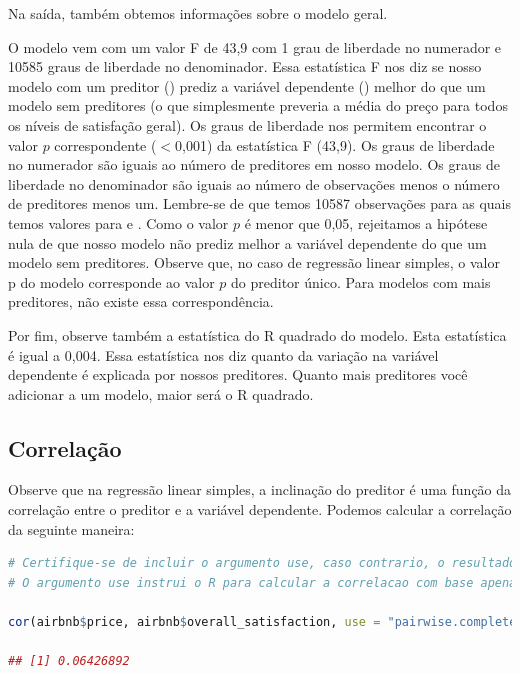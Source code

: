 \documentclass{article}
\begin{document}
Na saída, também obtemos informações sobre o modelo geral.

O modelo vem com um valor F de 43,9 com 1 grau de liberdade no numerador e 10585 graus de liberdade no denominador. Essa estatística F nos diz se nosso modelo com um preditor () prediz a variável dependente () melhor do que um modelo sem preditores (o que simplesmente preveria a média do preço para todos os níveis de satisfação geral). Os graus de liberdade nos permitem encontrar o valor $p$ correspondente ($<$0,001) da estatística F (43,9). Os graus de liberdade no numerador são iguais ao número de preditores em nosso modelo. Os graus de liberdade no denominador são iguais ao número de observações menos o número de preditores menos um. Lembre-se de que temos 10587 observações para as quais temos valores para  e . Como o valor $p$ é menor que 0,05, rejeitamos a hipótese nula de que nosso modelo não prediz melhor a variável dependente do que um modelo sem preditores. Observe que, no caso de regressão linear simples, o valor p do modelo corresponde ao valor $p$ do preditor único. Para modelos com mais preditores, não existe essa correspondência.

Por fim, observe também a estatística do R quadrado do modelo. Esta estatística é igual a 0,004. Essa estatística nos diz quanto da variação na variável dependente é explicada por nossos preditores. Quanto mais preditores você adicionar a um modelo, maior será o R quadrado.


\subsection{Correlação}

Observe que na regressão linear simples, a inclinação do preditor é uma função da correlação entre o preditor e a variável dependente. Podemos calcular a correlação da seguinte maneira:

\begin{lstlisting}[language=R]
# Certifique-se de incluir o argumento use, caso contrario, o resultado sera NA devido aos valores ausentes na overall_satisfaction.
# O argumento use instrui o R para calcular a correlacao com base apenas nas observacoes para as quais temos dados sobre price e overall_satisfaction.

cor(airbnb$price, airbnb$overall_satisfaction, use = "pairwise.complete.obs")

## [1] 0.06426892
\end{lstlisting}
\end{document}
